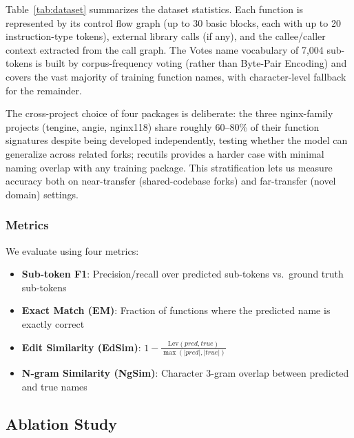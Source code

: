 \documentclass[sigconf,nonacm]{acmart}
\begin{document}
Table~\ref{tab:dataset} summarizes the dataset statistics. Each function is represented by its control flow graph (up to 30 basic blocks, each with up to 20 instruction-type tokens), external library calls (if any), and the callee/caller context extracted from the call graph. The Votes name vocabulary of 7{,}004 sub-tokens is built by corpus-frequency voting (rather than Byte-Pair Encoding) and covers the vast majority of training function names, with character-level fallback for the remainder.

The cross-project choice of four packages is deliberate: the three nginx-family projects (tengine, angie, nginx118) share roughly 60--80\% of their function signatures despite being developed independently, testing whether the model can generalize across related forks; recutils provides a harder case with minimal naming overlap with any training package. This stratification lets us measure accuracy both on near-transfer (shared-codebase forks) and far-transfer (novel domain) settings.

\subsubsection{Metrics}
We evaluate using four metrics:
\begin{itemize}
    \item \textbf{Sub-token F1}: Precision/recall over predicted sub-tokens vs.\ ground truth sub-tokens
    \item \textbf{Exact Match (EM)}: Fraction of functions where the predicted name is exactly correct
    \item \textbf{Edit Similarity (EdSim)}: $1 - \frac{\text{Lev}(pred, true)}{\max(|pred|, |true|)}$
    \item \textbf{N-gram Similarity (NgSim)}: Character 3-gram overlap between predicted and true names
\end{itemize}

\subsection{Ablation Study}
\label{sec:ablation}
\end{document}
